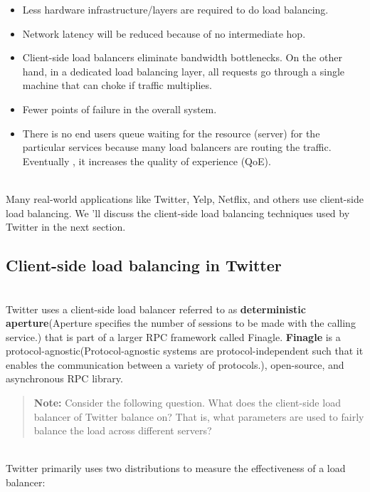 \begin{itemize}
\item
\protect{}\label{lZWCl4z9hi_xwd3Q5v0lv}
Less hardware infrastructure/layers are required to do load balancing.
\item
\protect{}\label{OWLXIO-1srmUK_wbwMVo_}
Network latency will be reduced because of no intermediate hop.
\item
\protect{}\label{MuY1CRR6dfX4XDZmAHSJQ}
Client-side load balancers eliminate bandwidth bottlenecks. On the other hand, in a dedicated load balancing layer, all requests go through a single machine that can choke if traffic multiplies.
\item
\protect{}\label{8UAqtNbQKrXpg4egeccc3}
Fewer points of failure in the overall system.
\item
\protect{}\label{KZTkHRDMcfMbsf4Zo71_X}
There is no end users queue waiting for the resource (server) for the particular services because many load balancers are routing the traffic. Eventually , it increases the quality of experience (QoE).
\end{itemize}
\\
Many real-world applications like Twitter, Yelp, Netflix, and others use client-side load balancing. We 'll discuss the client-side load balancing techniques used by Twitter in the next section.

\subsection{Client-side load balancing in Twitter}\label{_bZdMkVP1-uC4QF8Xx3Ax}
\\
Twitter uses a client-side load balancer referred to as \textbf{deterministic} \textbf{aperture}(Aperture specifies the number of sessions to be made with the calling service.) that is part of a larger RPC framework called Finagle. \textbf{Finagle} is a protocol-agnostic(Protocol-agnostic systems are protocol-independent such that it enables the communication between a variety of protocols.), open-source, and asynchronous RPC library.
\begin{quote}
\textbf{Note:} Consider the following question. What does the client-side load balancer of Twitter balance on? That is, what parameters are used to fairly balance the load across different servers?
\end{quote}
\\
Twitter primarily uses two distributions to measure the effectiveness of a load balancer:

